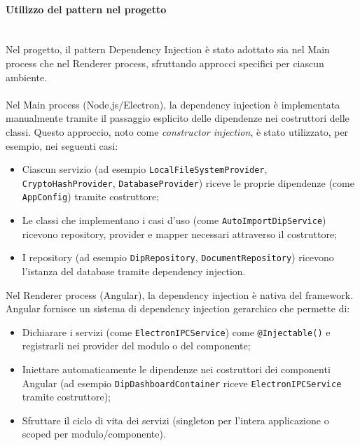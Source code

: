 \documentclass[a4paper,12pt]{article}
\begin{document}
{{{                \paragraph{ Utilizzo del pattern nel progetto}\mbox{}\\
                Nel progetto, il pattern Dependency Injection è stato adottato sia nel Main process che nel Renderer process, sfruttando approcci specifici per ciascun ambiente.\\
                \\
                Nel Main process (Node.js/Electron), la dependency injection è implementata manualmente tramite il passaggio esplicito delle dipendenze nei costruttori delle classi. Questo approccio, noto come \textit{constructor injection}, è stato utilizzato, per esempio, nei seguenti casi:
                \begin{itemize}
                    \item Ciascun servizio (ad esempio \texttt{LocalFileSystemProvider},\\ \texttt{CryptoHashProvider}, \texttt{DatabaseProvider}) riceve le proprie dipendenze (come\\ \texttt{AppConfig}) tramite costruttore;
                    \item Le classi che implementano i casi d'uso (come \texttt{AutoImportDipService}) ricevono repository, provider e mapper necessari attraverso il costruttore;
                    \item I repository (ad esempio \texttt{DipRepository}, \texttt{DocumentRepository}) ricevono l'istanza del database tramite dependency injection.
                \end{itemize}
                
                \noindent Nel Renderer process (Angular), la dependency injection è nativa del framework. Angular fornisce un sistema di dependency injection gerarchico che permette di:
                \begin{itemize}
                    \item Dichiarare i servizi (come \texttt{ElectronIPCService}) come \texttt{@Injectable()} e registrarli nei provider del modulo o del componente;
                    \item Iniettare automaticamente le dipendenze nei costruttori dei componenti Angular (ad esempio \texttt{DipDashboardContainer} riceve \texttt{ElectronIPCService} tramite costruttore);
                    \item Sfruttare il ciclo di vita dei servizi (singleton per l'intera applicazione o scoped per modulo/componente).
                \end{itemize}
                
}}}
\end{document}
